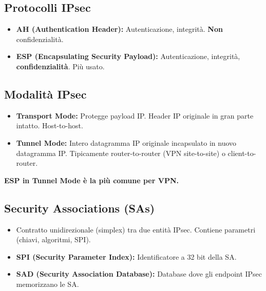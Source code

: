 \subsection{Protocolli IPsec}
\begin{itemize}
    \item \textbf{AH (Authentication Header):} Autenticazione, integrità. \textbf{Non} confidenzialità.
    \item \textbf{ESP (Encapsulating Security Payload):} Autenticazione, integrità, \textbf{confidenzialità}. Più usato.
\end{itemize}

\subsection{Modalità IPsec}
\begin{itemize}
    \item \textbf{Transport Mode:} Protegge payload IP. Header IP originale in gran parte intatto. Host-to-host.
    \item \textbf{Tunnel Mode:} Intero datagramma IP originale incapsulato in nuovo datagramma IP. Tipicamente router-to-router (VPN site-to-site) o client-to-router.
\end{itemize}
\textbf{ESP in Tunnel Mode è la più comune per VPN.}

\subsection{Security Associations (SAs)}
\begin{itemize}
    \item Contratto unidirezionale (simplex) tra due entità IPsec. Contiene parametri (chiavi, algoritmi, SPI).
    \item \textbf{SPI (Security Parameter Index):} Identificatore a 32 bit della SA.
    \item \textbf{SAD (Security Association Database):} Database dove gli endpoint IPsec memorizzano le SA.
\end{itemize}


